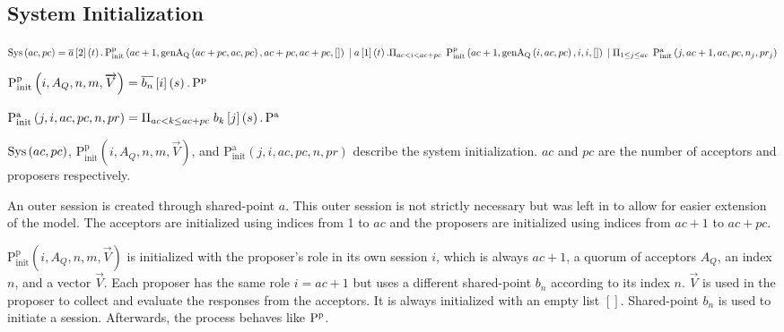 \newcommand{\PpInit}[5]{\operatorname{P^p_{init}}\left(#1, #2, #3, #4, #5\right)}
\newcommand{\PaInit}[6]{\operatorname{P^a_{init}}\left(#1, #2, #3, #4, #5, #6\right)}

\subsection{System Initialization}
\newcommand{\SessionRequest}[3]{\overline{#1}\left[#2\right]\left(#3\right)}
\newcommand{\SessionAccept}[3]{#1\left[#2\right]\left(#3\right)}
\newcommand{\ParallelFor}[1]{\Pi_{#1}\;}
\newcommand{\VectorV}[0]{\overrightarrow{V}}

$\Sys{ac}{pc} = \SessionRequest{a}{2}{t} . \PpInit{ac + 1}{\genAq{ac + pc}{ac}{pc}}{ac + pc}{ac + pc}{[]}\\
\Or \SessionAccept{a}{1}{t} . \ParallelFor{ac < i < ac + pc} \PpInit{ac + 1}{\genAq{i}{ac}{pc}}{i}{i}{[]} \\
\Or \ParallelFor{1 \le j \le ac} \PaInit{j}{ac + 1}{ac}{pc}{n_j}{pr_j}$

$\PpInit{i}{A_Q}{n}{m}{\VectorV} = \SessionRequest{b_n}{i}{s} . \Pp$

$\PaInit{j}{i}{ac}{pc}{n}{pr} = \ParallelFor{ac < k \le ac + pc} \SessionAccept{b_k}{j}{s} . \Pa$

$\operatorname{Sys}\left(ac, pc\right)$, $\PpInit{i}{A_Q}{n}{m}{\VectorV}$, and $\PaInit{j}{i}{ac}{pc}{n}{pr}$ describe the system initialization.
$ac$ and $pc$ are the number of acceptors and proposers respectively.

An outer session is created through shared-point $a$.
This outer session is not strictly necessary but was left in to allow for easier extension of the model.
The acceptors are initialized using indices from 1 to $ac$ and the proposers are initialized using indices from $ac + 1$ to $ac + pc$.

$\PpInit{i}{A_Q}{n}{m}{\VectorV}$ is initialized with the proposer's role in its own session $i$, which is always $ac + 1$, a quorum of acceptors $A_Q$, an index $n$, and a vector $\VectorV$.
Each proposer has the same role $i = ac + 1$ but uses a different shared-point $b_n$ according to its index $n$.
$\VectorV$ is used in the proposer to collect and evaluate the responses from the acceptors.
It is always initialized with an empty list $[]$.
Shared-point $b_n$ is used to initiate a session.
Afterwards, the process behaves like $\operatorname{P^p}$.

